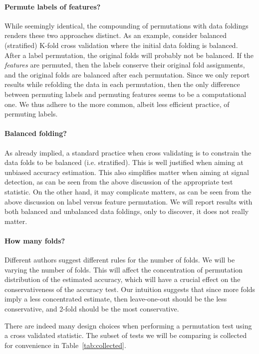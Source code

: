 \documentclass[12pt,a4paper]{article}
\begin{document}
\paragraph{Permute labels of features?}
While seemingly identical, the compounding of permutations with data foldings renders these two approaches distinct. 
As an example, consider balanced (stratified) K-fold cross validation where the initial data folding is balanced. 
After a label permutation, the original folds will probably not be balanced. 
If the \emph{features} are permuted, then the labels conserve their original fold assignments, and the original folds are balanced after each permutation. 
Since we only report results while refolding the data in each permutation, then the only difference between permuting labels and permuting features seems to be a computational one. 
We thus adhere to the more common, albeit less efficient practice, of permuting labels. 


\paragraph{Balanced folding?}
As already implied, a standard practice when cross validating is to constrain the data folds to be balanced (i.e. stratified).
This is well justified when aiming at unbiased accuracy estimation. 
This also simplifies matter when aiming at signal detection, as can be seen from the above discussion of the appropriate test statistic. 
On the other hand, it may complicate matters, as can be seen from the above discussion on label versus feature permutation. 
We will report results with both balanced and unbalanced data foldings, only to discover, it does not really matter. 


\paragraph{How many folds?}
Different authors suggest different rules for the number of folds. 
We will be varying the number of folds.
This will affect the concentration of permutation distribution of the estimated accuracy, which will have a crucial effect on the conservativeness of the accuracy test. 
Our intuition suggests that since more folds imply a less concentrated estimate, then leave-one-out should be the less conservative, and 2-fold should be the most conservative. 


There are indeed many design choices when performing a permutation test using a cross validated statistic. 
The subset of tests we will be comparing is collected for convenience in Table~\ref{tab:collected}.
\end{document}
